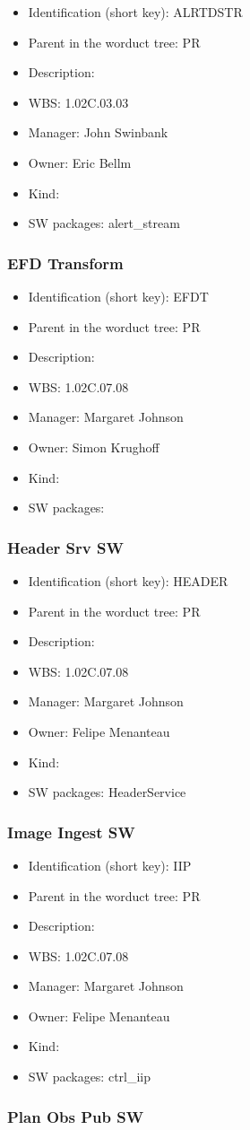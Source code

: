 \begin{itemize}\item Identification (short key): ALRTDSTR
\item Parent in the worduct tree: PR
\item Description: 
\item WBS: 1.02C.03.03
\item Manager: John Swinbank
\item Owner: Eric Bellm
\item Kind:
\item SW packages: alert\_stream
\end{itemize}\subsubsection{EFD Transform}
\begin{itemize}\item Identification (short key): EFDT
\item Parent in the worduct tree: PR
\item Description: 
\item WBS: 1.02C.07.08
\item Manager: Margaret Johnson
\item Owner: Simon Krughoff
\item Kind:
\item SW packages: 
\end{itemize}\subsubsection{Header Srv SW}
\begin{itemize}\item Identification (short key): HEADER
\item Parent in the worduct tree: PR
\item Description: 
\item WBS: 1.02C.07.08
\item Manager: Margaret Johnson
\item Owner: Felipe Menanteau
\item Kind:
\item SW packages: HeaderService
\end{itemize}\subsubsection{Image Ingest SW}
\begin{itemize}\item Identification (short key): IIP
\item Parent in the worduct tree: PR
\item Description: 
\item WBS: 1.02C.07.08
\item Manager: Margaret Johnson
\item Owner: Felipe Menanteau
\item Kind:
\item SW packages: ctrl\_iip
\end{itemize}\subsubsection{Plan Obs Pub SW}
